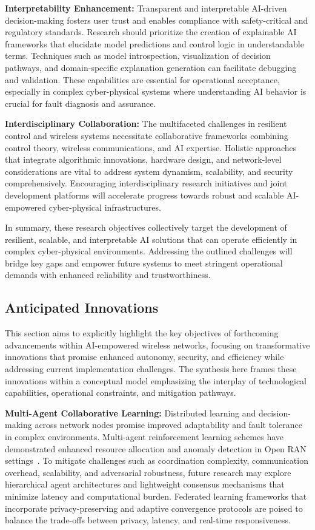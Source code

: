 \documentclass[sigconf]{acmart}
\begin{document}
\textbf{Interpretability Enhancement:} Transparent and interpretable AI-driven decision-making fosters user trust and enables compliance with safety-critical and regulatory standards. Research should prioritize the creation of explainable AI frameworks that elucidate model predictions and control logic in understandable terms. Techniques such as model introspection, visualization of decision pathways, and domain-specific explanation generation can facilitate debugging and validation. These capabilities are essential for operational acceptance, especially in complex cyber-physical systems where understanding AI behavior is crucial for fault diagnosis and assurance.

\textbf{Interdisciplinary Collaboration:} The multifaceted challenges in resilient control and wireless systems necessitate collaborative frameworks combining control theory, wireless communications, and AI expertise. Holistic approaches that integrate algorithmic innovations, hardware design, and network-level considerations are vital to address system dynamism, scalability, and security comprehensively. Encouraging interdisciplinary research initiatives and joint development platforms will accelerate progress towards robust and scalable AI-empowered cyber-physical infrastructures.

In summary, these research objectives collectively target the development of resilient, scalable, and interpretable AI solutions that can operate efficiently in complex cyber-physical environments. Addressing the outlined challenges will bridge key gaps and empower future systems to meet stringent operational demands with enhanced reliability and trustworthiness.

\subsection{Anticipated Innovations}

This section aims to explicitly highlight the key objectives of forthcoming advancements within AI-empowered wireless networks, focusing on transformative innovations that promise enhanced autonomy, security, and efficiency while addressing current implementation challenges. The synthesis here frames these innovations within a conceptual model emphasizing the interplay of technological capabilities, operational constraints, and mitigation pathways.

\textbf{Multi-Agent Collaborative Learning:} Distributed learning and decision-making across network nodes promise improved adaptability and fault tolerance in complex environments. Multi-agent reinforcement learning schemes have demonstrated enhanced resource allocation and anomaly detection in Open RAN settings~\cite{ref49}. To mitigate challenges such as coordination complexity, communication overhead, scalability, and adversarial robustness, future research may explore hierarchical agent architectures and lightweight consensus mechanisms that minimize latency and computational burden. Federated learning frameworks that incorporate privacy-preserving and adaptive convergence protocols are poised to balance the trade-offs between privacy, latency, and real-time responsiveness.
\end{document}
